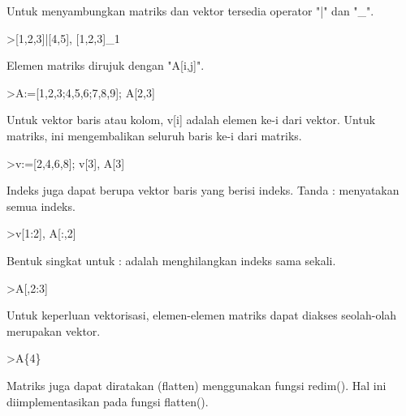 \documentclass[a4paper,10pt]{article}
\begin{document}
\begin{eulernotebook}
\begin{euleroutput}
  Untuk menyambungkan matriks dan vektor tersedia operator "|" dan "_".
  
\end{euleroutput}
\begin{eulerprompt}
>[1,2,3]|[4,5], [1,2,3]_1
\end{eulerprompt}
\begin{euleroutput}
  
  Elemen matriks dirujuk dengan "A[i,j]".
  
\end{euleroutput}
\begin{eulerprompt}
>A:=[1,2,3;4,5,6;7,8,9]; A[2,3]
\end{eulerprompt}
\begin{euleroutput}
  
  Untuk vektor baris atau kolom, v[i] adalah elemen ke-i dari vektor. Untuk matriks, ini mengembalikan seluruh baris ke-i dari matriks.
  
\end{euleroutput}
\begin{eulerprompt}
>v:=[2,4,6,8]; v[3], A[3]
\end{eulerprompt}
\begin{euleroutput}
  
  Indeks juga dapat berupa vektor baris yang berisi indeks. Tanda : menyatakan semua indeks.
  
\end{euleroutput}
\begin{eulerprompt}
>v[1:2], A[:,2]
\end{eulerprompt}
\begin{euleroutput}
  
  Bentuk singkat untuk : adalah menghilangkan indeks sama sekali.
  
\end{euleroutput}
\begin{eulerprompt}
>A[,2:3]
\end{eulerprompt}
\begin{euleroutput}
  
  Untuk keperluan vektorisasi, elemen-elemen matriks dapat diakses seolah-olah merupakan vektor.
  
\end{euleroutput}
\begin{eulerprompt}
>A\{4\}
\end{eulerprompt}
\begin{euleroutput}
  
  Matriks juga dapat diratakan (flatten) menggunakan fungsi redim(). Hal ini diimplementasikan pada fungsi flatten().
  

\end{euleroutput}
\end{eulernotebook}
\end{document}

